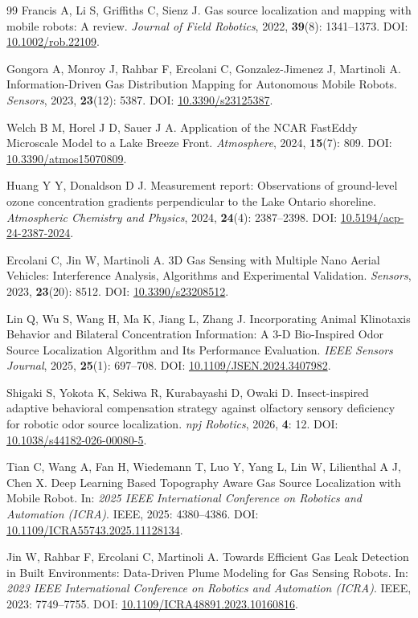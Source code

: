 \begin{thebibliography}{99}
\small
{}
Francis A, Li S, Griffiths C, Sienz J. Gas source localization and mapping with mobile robots: A review. {\sl Journal of Field Robotics}, 2022, {\bf 39}(8): 1341--1373. DOI: \url{10.1002/rob.22109}.

Gongora A, Monroy J, Rahbar F, Ercolani C, Gonzalez-Jimenez J, Martinoli A. Information-Driven Gas Distribution Mapping for Autonomous Mobile Robots. {\sl Sensors}, 2023, {\bf 23}(12): 5387. DOI: \url{10.3390/s23125387}.

Welch B M, Horel J D, Sauer J A. Application of the {NCAR FastEddy} Microscale Model to a Lake Breeze Front. {\sl Atmosphere}, 2024, {\bf 15}(7): 809. DOI: \url{10.3390/atmos15070809}.

Huang Y Y, Donaldson D J. Measurement report: Observations of ground-level ozone concentration gradients perpendicular to the {Lake Ontario} shoreline. {\sl Atmospheric Chemistry and Physics}, 2024, {\bf 24}(4): 2387--2398. DOI: \url{10.5194/acp-24-2387-2024}.

Ercolani C, Jin W, Martinoli A. 3D Gas Sensing with Multiple Nano Aerial Vehicles: Interference Analysis, Algorithms and Experimental Validation. {\sl Sensors}, 2023, {\bf 23}(20): 8512. DOI: \url{10.3390/s23208512}.

Lin Q, Wu S, Wang H, Ma K, Jiang L, Zhang J. Incorporating Animal Klinotaxis Behavior and Bilateral Concentration Information: A {3-D} Bio-Inspired Odor Source Localization Algorithm and Its Performance Evaluation. {\sl IEEE Sensors Journal}, 2025, {\bf 25}(1): 697--708. DOI: \url{10.1109/JSEN.2024.3407982}.

Shigaki S, Yokota K, Sekiwa R, Kurabayashi D, Owaki D. Insect-inspired adaptive behavioral compensation strategy against olfactory sensory deficiency for robotic odor source localization. {\sl npj Robotics}, 2026, {\bf 4}: 12. DOI: \url{10.1038/s44182-026-00080-5}.

Tian C, Wang A, Fan H, Wiedemann T, Luo Y, Yang L, Lin W, Lilienthal A J, Chen X. Deep Learning Based Topography Aware Gas Source Localization with Mobile Robot. In: {\sl 2025 IEEE International Conference on Robotics and Automation (ICRA)}. IEEE, 2025: 4380--4386. DOI: \url{10.1109/ICRA55743.2025.11128134}.

Jin W, Rahbar F, Ercolani C, Martinoli A. Towards Efficient Gas Leak Detection in Built Environments: Data-Driven Plume Modeling for Gas Sensing Robots. In: {\sl 2023 IEEE International Conference on Robotics and Automation (ICRA)}. IEEE, 2023: 7749--7755. DOI: \url{10.1109/ICRA48891.2023.10160816}.


\end{thebibliography}

